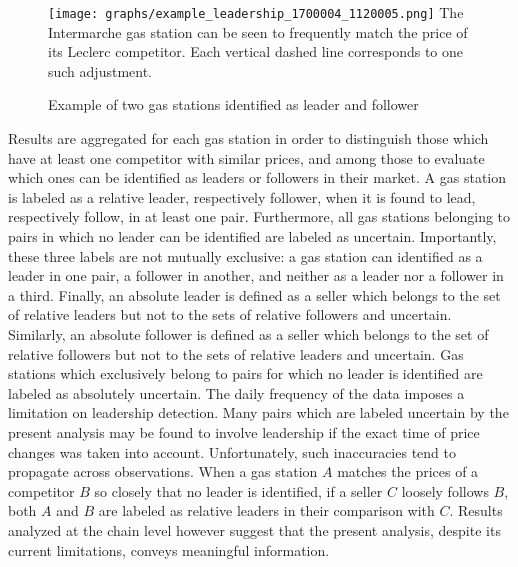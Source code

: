 \documentclass[english]{article}
\begin{document}
\begin{figure}[htb!]
    \caption{Example of two gas stations identified as leader and follower}
	\centering
		\texttt{[image: graphs/example\_leadership\_1700004\_1120005.png]}
\label{fig:leader_pair_example}
\flushleft
\small
The Intermarche gas station can be seen to frequently match the price of its Leclerc competitor. Each vertical dashed line corresponds to one such adjustment.
\end{figure}

Results are aggregated for each gas station in order to distinguish those which have at least one competitor with similar prices, and among those to evaluate which ones can be identified as leaders or followers in their market. A gas station is labeled as a relative leader, respectively follower, when it is found to lead, respectively follow, in at least one pair. Furthermore, all gas stations belonging to pairs in which no leader can be identified are labeled as uncertain. Importantly, these three labels are not mutually exclusive: a gas station can identified as a leader in one pair, a follower in another, and neither as a leader nor a follower in a third. Finally, an absolute leader is defined as a seller which belongs to the set of relative leaders but not to the sets of relative followers and uncertain. Similarly, an absolute follower is defined as a seller which belongs to the set of relative followers but not to the sets of relative leaders and uncertain. Gas stations which exclusively belong to pairs for which no leader is identified are labeled as absolutely uncertain. The daily frequency of the data imposes a limitation on leadership detection. Many pairs which are labeled uncertain by the present analysis may be found to involve leadership if the exact time of price changes was taken into account. Unfortunately, such inaccuracies tend to propagate across observations. When a gas station $A$ matches the prices of a competitor $B$ so closely that no leader is identified, if a seller $C$ loosely follows $B$, both $A$ and $B$ are labeled as relative leaders in their comparison with $C$. Results analyzed at the chain level however suggest that the present analysis, despite its current limitations, conveys meaningful information.
\end{document}
